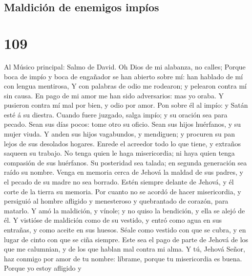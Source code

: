 \hypertarget{maldiciuxf3n-de-enemigos-impuxedos}{%
\subsection{Maldición de enemigos
impíos}\label{maldiciuxf3n-de-enemigos-impuxedos}}

\hypertarget{section-108}{%
\section{109}\label{section-108}}

 Al Músico principal: Salmo de David. Oh Dios de mi
alabanza, no calles;  Porque boca de impío y boca de
engañador se han abierto sobre mí: han hablado de mí con lengua
mentirosa,  Y con palabras de odio me rodearon; y pelearon
contra mí sin causa.  En pago de mi amor me han sido
adversarios: mas yo oraba.  Y pusieron contra mí mal por
bien, y odio por amor.  Pon sobre él al impío: y Satán
esté á su diestra.  Cuando fuere juzgado, salga impío; y
su oración sea para pecado.  Sean sus días pocos: tome
otro su oficio.  Sean sus hijos huérfanos, y su mujer
viuda.  Y anden sus hijos vagabundos, y mendiguen; y
procuren su pan lejos de sus desolados hogares.  Enrede
el acreedor todo lo que tiene, y extraños saqueen su trabajo.
 No tenga quien le haga misericordia; ni haya quien tenga
compasión de sus huérfanos.  Su posteridad sea talada; en
segunda generación sea raído su nombre.  Venga en memoria
cerca de Jehová la maldad de sus padres, y el pecado de su madre no sea
borrado.  Estén siempre delante de Jehová, y él corte de
la tierra su memoria.  Por cuanto no se acordó de hacer
misericordia, y persiguió al hombre afligido y menesteroso y quebrantado
de corazón, para matarlo.  Y amó la maldición, y vínole;
y no quiso la bendición, y ella se alejó de él.  Y
vistióse de maldición como de su vestido, y entró como agua en sus
entrañas, y como aceite en sus huesos.  Séale como
vestido con que se cubra, y en lugar de cinto con que se ciña siempre.
 Este sea el pago de parte de Jehová de los que me
calumnian, y de los que hablan mal contra mi alma.  Y tú,
Jehová Señor, haz conmigo por amor de tu nombre: líbrame, porque tu
misericordia es buena.  Porque yo estoy afligido y
